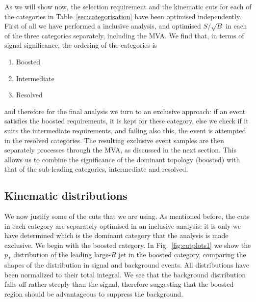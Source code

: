 As we will show now, the selection requirement and the kinematic cuts
for each of the categories in Table~\ref{sec:categorisation} have
been optimised independently.
%
First of all we have performed a inclusive analysis, and optimised
$S/\sqrt{B}$ in each of the three categories separately, including
the MVA.
%
We find that, in terms of signal significance, the ordering of
the categories is
\begin{enumerate}
\item Boosted 
\item Intermediate
  \item Resolved
  \end{enumerate}
and therefore for the final analysis we turn to an exclusive approach:
if an event satisfies the boosted requirements, it is kept for
these category, else we check if it suits the intermediate
requirements, and failing also this, the event is attempted
in the resolved categories.
%
The resulting exclusive event samples are then separately processes
through the MVA, as discussed in the next section.
%
This allows us to combine the significance of the dominant topology
(boosted) with that of the sub-leading categories, intermediate
and resolved.

\subsection{Kinematic distributions}

We now justify some of the cuts that we are using.
%
As mentioned before, the cuts in each category are separately
optimised in an inclusive analysis: it is only we have determined
which is the dominant category that the analysis is made exclusive.
%
We begin with the boosted category.
%
In Fig.~\ref{fig:cutplots1} we show
the $p_T$ distribution of the
  leading large-$R$ jet in the boosted category, comparing
  the shapes of the distribution in signal and background events.
  All distributions have been normalized to their total integral.
  We see that the background distribution
  falls off rather steeply than the signal, therefore
  suggesting that the boosted region should be
  advantageous to suppress the background.



